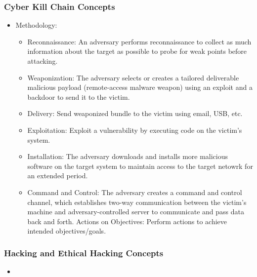 \subsubsection{Cyber Kill Chain Concepts}
\begin{itemize}
    \item Methodology:
    \begin{itemize}
        \item Reconnaissance: An adversary performs reconnaissance to collect as much information about the target as possible to probe for weak points before attacking.
        \item Weaponization: The adversary selects or creates a tailored deliverable malicious payload (remote-access malware weapon) using an exploit and a backdoor to send it to the victim.
        \item Delivery: Send weaponized bundle to the victim using email, USB, etc.
        \item Exploitation: Exploit a vulnerability by executing code on the victim's system.
        \item Installation: The adversary downloads and installs more malicious software on the target system to maintain access to the target netowrk for an extended period.
        \item Command and Control: The adversary creates a command and control channel, which establishes two-way communication between the victim's machine and adversary-controlled server to communicate and pass data back and forth.
        Actions on Objectives: Perform actions to achieve intended objectives/goals.
    \end{itemize}
\end{itemize}
\subsubsection{Hacking and Ethical Hacking Concepts}
\begin{itemize}
    \item 
\end{itemize}

